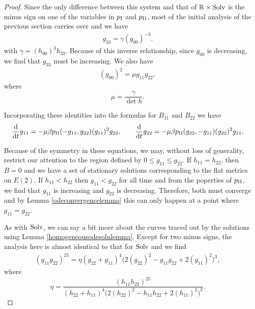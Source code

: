 \documentclass[10pt,a4paper]{amsart}
\numberwithin{equation}{section}
\newcommand{\dtime}{\frac{{\rm d}}{{\rm d} t}} %
\begin{document}
\begin{proof}
Since the only difference between this system and that of $\mathbb{R} \times {\rm Solv}$ is the minus sign on one of the variables in $p_{\rm I}$ and $p_{\rm II}$, most of the initial analysis of the previous section carries over and we have
\begin{gather} \label{e2g33eqn}
g_{33} = \gamma (g_{00})^{-3}.
\end{gather}
with $\gamma = (h_{00})^3 h_{33}$. Because of this inverse relationship, since $g_{00}$ is decreasing, we find that $g_{33}$ must be increasing. We also have
\begin{gather} \label{e2g00eqn}
(g_{00})^2 = \mu g_{11} g_{22},
\end{gather}
where
\[
\mu = \frac{\gamma}{\det h}.
\]

Incorporating these identities into the formulas for $B_{11}$ and $B_{22}$ we have
\begin{gather*}
\dtime g_{11} = -\mu \beta p_{\rm II}(-g_{11}, g_{22}) (g_{11})^2 g_{22}, \qquad
\dtime g_{22} = -\mu \beta p_{\rm II}(g_{22}, -g_{11}) (g_{22})^2 g_{11}.
\end{gather*}

Because of the symmetry in these equations, we may, without loss of generality, restrict our attention to the region defined by $0 \leq g_{11} \leq g_{22}$. If $h_{11} = h_{22}$, then $B = 0$ and we have a set of stationary solutions corresponding to the flat metrics on $E(2)$. If $h_{11} < h_{22}$ then $g_{11} < g_{22}$ for all time and from the poperties of $p_{\rm II}$, we find that $g_{11}$ is increasing and $g_{22}$ is decreasing. Therefore, both must converge and by Lemma \ref{odeconvergencelemma} this can only happen at a point where $g_{11} = g_{22}$.

As with ${\rm Solv}$, we can say a bit more about the curves traced out by the solutions using Lemma \ref{homogeneousodesolnlemma}. Except for two minus signs, the analysis here is almost identical to that for ${\rm Solv}$ and we find
\begin{gather} \label{e2curveeqn}
(g_{11} g_{22})^{25} = \eta (g_{22}+g_{11})^{4} \big(2(g_{22})^2 - g_{11} g_{22} + 2(g_{11})^2\big)^{3},
\end{gather}
where
\[
\eta = \frac{(h_{11} h_{22})^{25}}{(h_{22}+h_{11})^{4}
				\big(2(h_{22})^2 - h_{11} h_{22} + 2(h_{11})^2\big)^{3}}.
\]


\end{proof}
\end{document}
